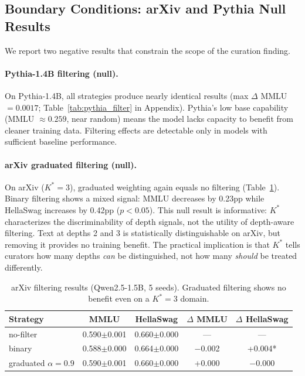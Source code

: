 \documentclass[11pt]{article}
\begin{document}
\subsection{Boundary Conditions: arXiv and Pythia Null Results}

We report two negative results that constrain the scope of the curation finding.

\paragraph{Pythia-1.4B filtering (null).} On Pythia-1.4B, all strategies produce nearly identical results (max $\Delta$ MMLU $= 0.0017$; Table~\ref{tab:pythia_filter} in Appendix). Pythia's low base capability (MMLU $\approx 0.259$, near random) means the model lacks capacity to benefit from cleaner training data. Filtering effects are detectable only in models with sufficient baseline performance.

\paragraph{arXiv graduated filtering (null).} On arXiv ($K^* = 3$), graduated weighting again equals no filtering (Table~\ref{tab:arxiv_filter}). Binary filtering shows a mixed signal: MMLU decreases by 0.23pp while HellaSwag increases by 0.42pp ($p < 0.05$). This null result is informative: $K^*$ characterizes the discriminability of depth signals, not the utility of depth-aware filtering. Text at depths 2 and 3 is statistically distinguishable on arXiv, but removing it provides no training benefit. The practical implication is that $K^*$ tells curators how many depths \emph{can} be distinguished, not how many \emph{should} be treated differently.

\begin{table}[t]
\centering
\caption{arXiv filtering results (Qwen2.5-1.5B, 5 seeds). Graduated filtering shows no benefit even on a $K^*{=}3$ domain.}
\label{tab:arxiv_filter}
\small
\begin{tabular}{lcccc}
\toprule
Strategy & MMLU & HellaSwag & $\Delta$ MMLU & $\Delta$ HellaSwag \\
\midrule
no-filter & 0.590$\pm$0.001 & 0.660$\pm$0.000 & --- & --- \\
binary & 0.588$\pm$0.000 & 0.664$\pm$0.000 & $-$0.002 & +0.004* \\
graduated $\alpha{=}0.9$ & 0.590$\pm$0.001 & 0.660$\pm$0.000 & +0.000 & $-$0.000 \\
\bottomrule
\end{tabular}
\end{table}
\end{document}

